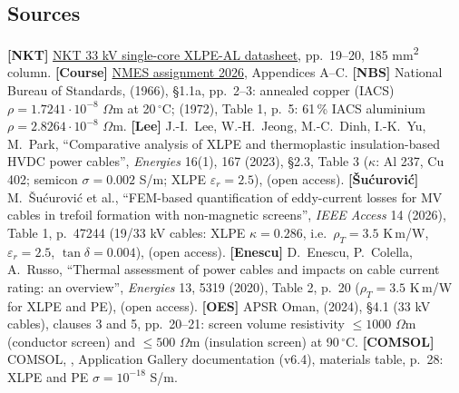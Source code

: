 \subsection*{Sources}
\small
\textbf{[NKT]} \href{../Datasheet NKT 33 kV single core cable XLPE-AL.pdf}{NKT 33 kV single-core XLPE-AL datasheet}, pp.~19--20, 185 mm\textsuperscript2 column.
\textbf{[Course]} \href{../NMES_Assignment_2026.pdf}{NMES assignment 2026}, Appendices A--C.
\textbf{[NBS]} National Bureau of Standards,  (1966), \S1.1a, pp.~2--3: annealed copper (IACS) \(\rho=1.7241\cdot10^{-8}\) \(\Omega\)m at 20\,\(^\circ\)C;
 (1972), Table 1, p.~5: 61\,\% IACS aluminium \(\rho=2.8264\cdot10^{-8}\) \(\Omega\)m.
\textbf{[Lee]} J.-I.~Lee, W.-H.~Jeong, M.-C.~Dinh, I.-K.~Yu, M.~Park, ``Comparative analysis of XLPE and thermoplastic insulation-based HVDC power cables'', \emph{Energies} 16(1), 167 (2023), \S2.3, Table 3 (\(\kappa\): Al 237, Cu 402; semicon \(\sigma=0.002\) S/m; XLPE \(\varepsilon_r=2.5\)),  (open access).
\textbf{[\v{S}u\'{c}urovi\'{c}]} M.~\v{S}u\'{c}urovi\'{c} et al., ``FEM-based quantification of eddy-current losses for MV cables in trefoil formation with non-magnetic screens'', \emph{IEEE Access} 14 (2026), Table 1, p.~47244 (19/33 kV cables: XLPE \(\kappa=0.286\), i.e.\ \(\rho_T=3.5\) K\,m/W, \(\varepsilon_r=2.5\), \(\tan\delta=0.004\)),  (open access).
\textbf{[Enescu]} D.~Enescu, P.~Colella, A.~Russo, ``Thermal assessment of power cables and impacts on cable current rating: an overview'', \emph{Energies} 13, 5319 (2020), Table 2, p.~20 (\(\rho_T=3.5\) K\,m/W for XLPE and PE),  (open access).
\textbf{[OES]} APSR Oman,  (2024), \S4.1 (33 kV cables), clauses 3 and 5, pp.~20--21: screen volume resistivity \(\le1000\) \(\Omega\)m (conductor screen) and \(\le500\) \(\Omega\)m (insulation screen) at 90\,\(^\circ\)C.
\textbf{[COMSOL]} COMSOL, , Application Gallery documentation (v6.4), materials table, p.~28: XLPE and PE \(\sigma=10^{-18}\) S/m.

